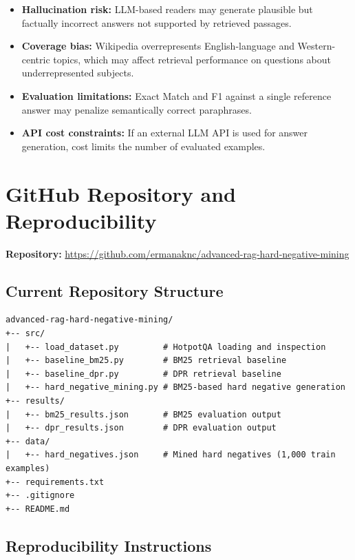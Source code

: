 \documentclass[12pt,a4paper]{article}
\begin{document}
\begin{itemize}[noitemsep]
    \item \textbf{Hallucination risk:} LLM-based readers may generate plausible but
          factually incorrect answers not supported by retrieved passages.
    \item \textbf{Coverage bias:} Wikipedia overrepresents English-language and
          Western-centric topics, which may affect retrieval performance on questions
          about underrepresented subjects.
    \item \textbf{Evaluation limitations:} Exact Match and F1 against a single reference
          answer may penalize semantically correct paraphrases.
    \item \textbf{API cost constraints:} If an external LLM API is used for answer
          generation, cost limits the number of evaluated examples.
\end{itemize}

\section{GitHub Repository and Reproducibility}

\textbf{Repository:}
\url{https://github.com/ermanaknc/advanced-rag-hard-negative-mining}

\subsection*{Current Repository Structure}

\begin{lstlisting}
advanced-rag-hard-negative-mining/
+-- src/
|   +-- load_dataset.py         # HotpotQA loading and inspection
|   +-- baseline_bm25.py        # BM25 retrieval baseline
|   +-- baseline_dpr.py         # DPR retrieval baseline
|   +-- hard_negative_mining.py # BM25-based hard negative generation
+-- results/
|   +-- bm25_results.json       # BM25 evaluation output
|   +-- dpr_results.json        # DPR evaluation output
+-- data/
|   +-- hard_negatives.json     # Mined hard negatives (1,000 train examples)
+-- requirements.txt
+-- .gitignore
+-- README.md
\end{lstlisting}

\subsection*{Reproducibility Instructions}
\end{document}
